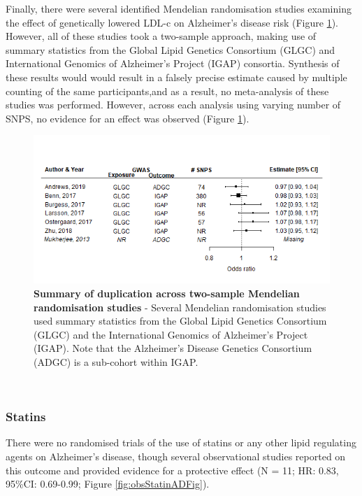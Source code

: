 \documentclass[a4paper, twoside]{templates/ociamthesis}
\begin{document}
Finally, there were several identified Mendelian randomisation studies examining the effect of genetically lowered LDL-c on Alzheimer's disease risk (Figure \ref{fig:mrDuplication}). However, all of these studies took a two-sample approach, making use of summary statistics from the Global Lipid Genetics Consortium (GLGC) and International Genomics of Alzheimer's Project (IGAP) consortia. Synthesis of these results would would result in a falsely precise estimate caused by multiple counting of the same participants,and as a result, no meta-analysis of these studies was performed. However, across each analysis using varying number of SNPS, no evidence for an effect was observed (Figure \ref{fig:mrDuplication}).





\begin{figure}[H]

{\centering \includegraphics[width=0.8\linewidth]{figures/sys-rev/mrDuplication} 

}

\caption[Summary of duplication across two-sample Mendelian randomisation studies]{\textbf{Summary of duplication across two-sample Mendelian randomisation studies} - Several Mendelian randomisation studies used summary statistics from the Global Lipid Genetics Consortium (GLGC) and the International Genomics of Alzheimer's Project (IGAP). Note that the Alzheimer's Disease Genetics Consortium (ADGC) is a sub-cohort within IGAP.}\label{fig:mrDuplication}
\end{figure}

~

\hypertarget{statins-1}{%
\subsubsection{Statins}\label{statins-1}}

There were no randomised trials of the use of statins or any other lipid regulating agents on Alzheimer's disease, though several observational studies reported on this outcome and provided evidence for a protective effect (N = 11; HR: 0.83, 95\%CI: 0.69-0.99; Figure \ref{fig:obsStatinADFig}).
\end{document}
